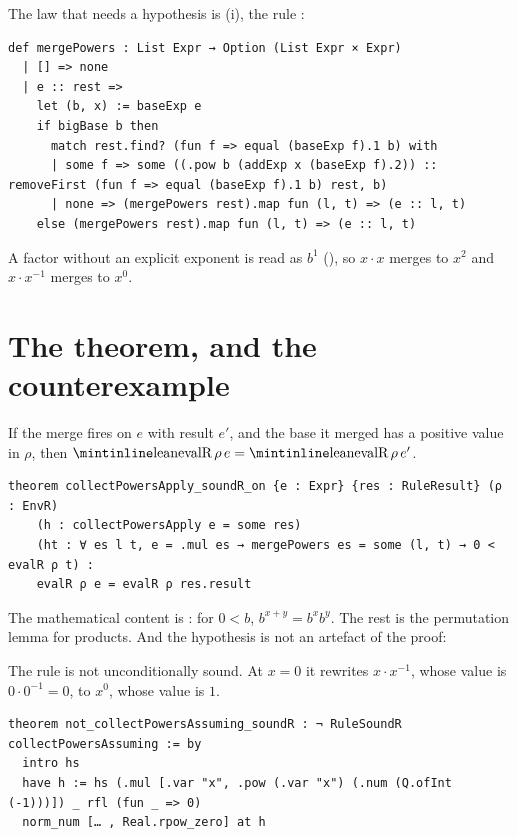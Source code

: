 The law that needs a hypothesis is (i), the rule :

\begin{verbatim}
def mergePowers : List Expr → Option (List Expr × Expr)
  | [] => none
  | e :: rest =>
    let (b, x) := baseExp e
    if bigBase b then
      match rest.find? (fun f => equal (baseExp f).1 b) with
      | some f => some ((.pow b (addExp x (baseExp f).2)) :: removeFirst (fun f => equal (baseExp f).1 b) rest, b)
      | none => (mergePowers rest).map fun (l, t) => (e :: l, t)
    else (mergePowers rest).map fun (l, t) => (e :: l, t)
\end{verbatim}

A factor without an explicit exponent is read as $b^1$ (), so $x \cdot x$ merges to
$x^2$ and $x \cdot x^{-1}$ merges to $x^0$.

\section{The theorem, and the counterexample}

\begin{thmbox}
  If the merge fires on $e$ with result $e'$, and the base it merged has a positive value in
  $\rho$, then $\lc{evalR}\,\rho\,e = \lc{evalR}\,\rho\,e'$.
\end{thmbox}

\begin{verbatim}
theorem collectPowersApply_soundR_on {e : Expr} {res : RuleResult} (ρ : EnvR)
    (h : collectPowersApply e = some res)
    (ht : ∀ es l t, e = .mul es → mergePowers es = some (l, t) → 0 < evalR ρ t) :
    evalR ρ e = evalR ρ res.result
\end{verbatim}

The mathematical content is : for $0 < b$, $b^{x+y} = b^x b^y$. The rest is the
permutation lemma for products. And the hypothesis is not an artefact of the proof:

\begin{thmbox}
  The rule is not unconditionally sound. At $x = 0$ it rewrites $x \cdot x^{-1}$, whose value is
  $0 \cdot 0^{-1} = 0$, to $x^0$, whose value is $1$.
\end{thmbox}

\begin{verbatim}
theorem not_collectPowersAssuming_soundR : ¬ RuleSoundR collectPowersAssuming := by
  intro hs
  have h := hs (.mul [.var "x", .pow (.var "x") (.num (Q.ofInt (-1)))]) _ rfl (fun _ => 0)
  norm_num [… , Real.rpow_zero] at h
\end{verbatim}

